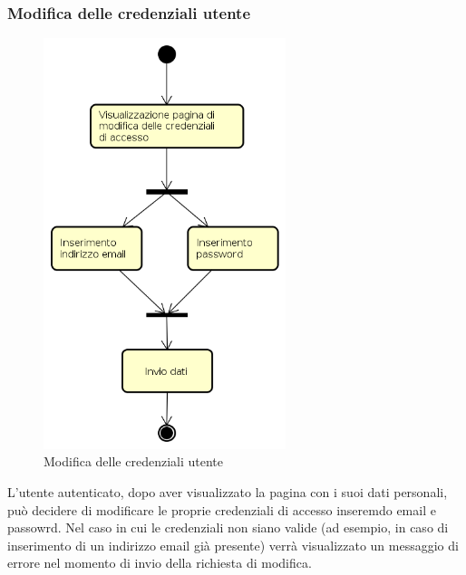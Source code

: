 \subsubsection{Modifica delle credenziali utente}
\begin{figure}[H]
\begin{center}
\includegraphics[height=12cm]{res/sections/backend/activities/modificaCredenziali.png}
\caption{Modifica delle credenziali utente}
\end{center}
\end{figure}
L'utente autenticato, dopo aver visualizzato la pagina con i suoi dati personali, può decidere di modificare le proprie credenziali di accesso inseremdo email e passowrd. Nel caso in cui le credenziali non siano valide (ad esempio, in caso di inserimento di un indirizzo email già presente) verrà visualizzato un messaggio di errore nel momento di invio della richiesta di modifica.
